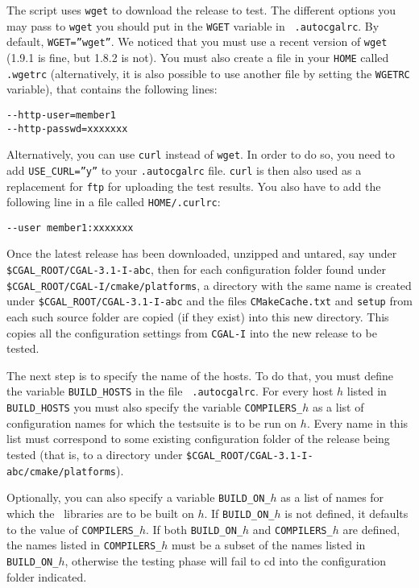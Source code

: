 The script uses {\tt wget} to download the release to test. The different options you
may pass to {\tt wget} you should put in the {\tt WGET} variable in {\tt
.autocgalrc}. By default, {\tt WGET=''wget''}. We noticed that you must use
a recent version of {\tt wget} (1.9.1 is fine, but 1.8.2 is not). You must
also create a file in your {\tt HOME} called {\tt .wgetrc} (alternatively,
it is also possible to use another file by setting the {\tt WGETRC} variable),
that contains the following lines:
\begin{verbatim}
--http-user=member1
--http-passwd=xxxxxxx
\end{verbatim}

Alternatively, you can use {\tt curl} instead of {\tt wget}.  In order to
do so, you need to add {\tt USE\_CURL=''y''} to your {\tt .autocgalrc} file.
{\tt curl} is then also used as a replacement for {\tt ftp} for uploading the
test results.
You also have to add the following line in a file called {\tt HOME/.curlrc}:
\begin{verbatim}
--user member1:xxxxxxx
\end{verbatim}

Once the latest release has been downloaded, unzipped and untared, 
say under {\tt \$CGAL\_ROOT/CGAL-3.1-I-abc}, then for each configuration
folder found under {\tt \$CGAL\_ROOT/CGAL-I/cmake/platforms}, a directory
with the same name is created under {\tt \$CGAL\_ROOT/CGAL-3.1-I-abc}
and the files {\tt CMakeCache.txt} and {\tt setup} from each such source 
folder are copied (if they exist) into this new directory.
This copies all the configuration settings from
{\tt CGAL-I} into the new release to be tested.

The next step is to specify the name of the hosts. To do that, you
must define the variable \texttt{BUILD\_HOSTS} in the file {\tt
  .autocgalrc}. For every host $h$ listed in \texttt{BUILD\_HOSTS} you
must also specify the variable \texttt{COMPILERS\_$h$} as a list of
configuration names for which the testsuite is to be run on $h$. 
Every name in this list must correspond to some existing
configuration folder of the release being tested
(that is, to a directory under {\tt \$CGAL\_ROOT/CGAL-3.1-I-abc/cmake/platforms}).


Optionally, you can also specify a variable \texttt{BUILD\_ON\_$h$} as
a list of names for which the \cgal\ libraries are
to be built on $h$. If \texttt{BUILD\_ON\_$h$} is not defined, it
defaults to the value of \texttt{COMPILERS\_$h$}. If
both \texttt{BUILD\_ON\_$h$} and \texttt{COMPILERS\_$h$} are defined,
the names listed in \texttt{COMPILERS\_$h$} must be a subset of the names 
listed in \texttt{BUILD\_ON\_$h$}, otherwise the testing phase will fail
to cd into the configuration folder indicated.

